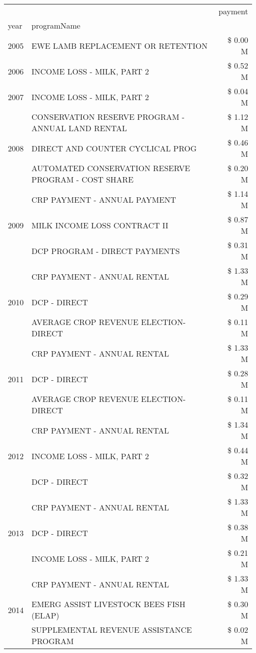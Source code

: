 \begin{tabular}{llr}
\toprule
 &  & payment \\
year & programName &  \\
\midrule
2005 & EWE LAMB REPLACEMENT OR RETENTION & \$ 0.00 M \\
\cline{1-3}
2006 & INCOME LOSS - MILK, PART 2 & \$ 0.52 M \\
\cline{1-3}
2007 & INCOME LOSS - MILK, PART 2 & \$ 0.04 M \\
\cline{1-3}
\multirow[t]{3}{*}{2008} & CONSERVATION RESERVE PROGRAM - ANNUAL LAND RENTAL & \$ 1.12 M \\
 & DIRECT AND COUNTER CYCLICAL PROG & \$ 0.46 M \\
 & AUTOMATED CONSERVATION RESERVE PROGRAM - COST SHARE & \$ 0.20 M \\
\cline{1-3}
\multirow[t]{3}{*}{2009} & CRP PAYMENT - ANNUAL PAYMENT & \$ 1.14 M \\
 & MILK INCOME LOSS CONTRACT II & \$ 0.87 M \\
 & DCP PROGRAM - DIRECT PAYMENTS & \$ 0.31 M \\
\cline{1-3}
\multirow[t]{3}{*}{2010} & CRP PAYMENT - ANNUAL RENTAL & \$ 1.33 M \\
 & DCP - DIRECT & \$ 0.29 M \\
 & AVERAGE CROP REVENUE ELECTION-DIRECT & \$ 0.11 M \\
\cline{1-3}
\multirow[t]{3}{*}{2011} & CRP PAYMENT - ANNUAL RENTAL & \$ 1.33 M \\
 & DCP - DIRECT & \$ 0.28 M \\
 & AVERAGE CROP REVENUE ELECTION-DIRECT & \$ 0.11 M \\
\cline{1-3}
\multirow[t]{3}{*}{2012} & CRP PAYMENT - ANNUAL RENTAL & \$ 1.34 M \\
 & INCOME LOSS - MILK, PART 2 & \$ 0.44 M \\
 & DCP - DIRECT & \$ 0.32 M \\
\cline{1-3}
\multirow[t]{3}{*}{2013} & CRP PAYMENT - ANNUAL RENTAL & \$ 1.33 M \\
 & DCP - DIRECT & \$ 0.38 M \\
 & INCOME LOSS - MILK, PART 2 & \$ 0.21 M \\
\cline{1-3}
\multirow[t]{3}{*}{2014} & CRP PAYMENT - ANNUAL RENTAL & \$ 1.33 M \\
 & EMERG ASSIST LIVESTOCK BEES FISH (ELAP) & \$ 0.30 M \\
 & SUPPLEMENTAL REVENUE ASSISTANCE PROGRAM & \$ 0.02 M \\
\cline{1-3}

\end{tabular}

